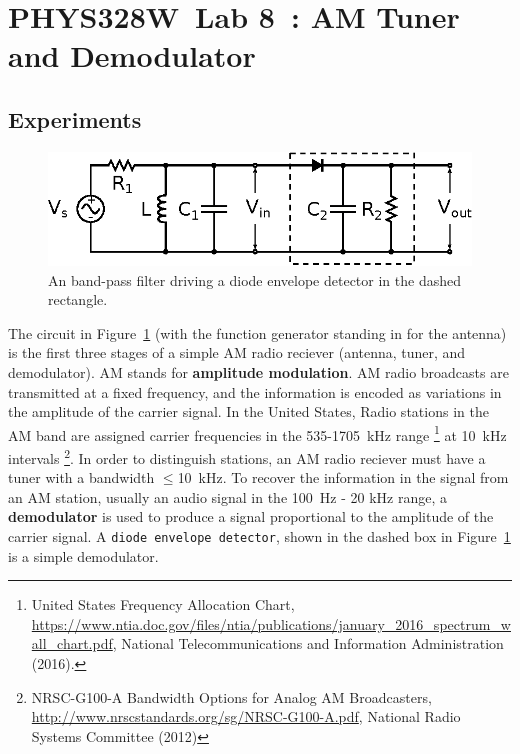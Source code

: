 \documentclass[11pt]{article}
\newcommand{\COURSE}{PHYS328W}
\newcommand{\LABNUM}{8}
\newcommand{\TITLE}{AM Tuner and Demodulator}
\begin{document}
\thispagestyle{empty}

\section*{\COURSE\ Lab \LABNUM\ : \TITLE}

\subsection*{Experiments}

\begin{figure}[h]
\centering
\includegraphics{demodulator.eps}
\caption{An band-pass filter driving a diode envelope
  detector in the dashed rectangle.}
\label{fig:demodulator}
\end{figure}

The circuit in Figure~\ref{fig:demodulator} (with the function
generator standing in for the antenna) is the first three stages of a
simple AM radio reciever (antenna, tuner, and demodulator). AM stands
for \textbf{amplitude modulation}. AM radio broadcasts are transmitted
at a fixed frequency, and the information is encoded as variations in
the amplitude of the carrier signal. In the United States, Radio
stations in the AM band are assigned carrier frequencies in the
535-1705~kHz range
\footnote{United States Frequency Allocation Chart,
  \url{https://www.ntia.doc.gov/files/ntia/publications/january_2016_spectrum_wall_chart.pdf},
  National Telecommunications and Information Administration
  (2016).}
at 10~kHz intervals
\footnote{NRSC-G100-A Bandwidth Options for Analog AM Broadcasters,
  \url{http://www.nrscstandards.org/sg/NRSC-G100-A.pdf},
  National Radio Systems Committee (2012)}.
In order to distinguish stations, an AM 
radio reciever must have a tuner with a bandwidth $\leq$10~kHz.  To
recover the information in the signal from an AM station, usually an
audio signal in the 100~Hz - 20 kHz range, a \textbf{demodulator} is
used to produce a signal proportional to the amplitude of the carrier
signal. A \texttt{diode envelope detector}, shown in the dashed box in
Figure~\ref{fig:demodulator} is a simple demodulator.
\end{document}
